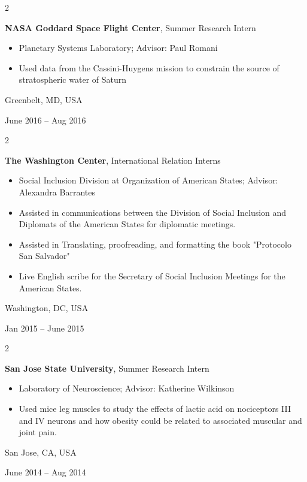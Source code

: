 \documentclass[10pt, letterpaper]{article}
\newenvironment{highlights}{
    \begin{itemize}[
        topsep=0.10 cm,
        parsep=0.10 cm,
        partopsep=0pt,
        itemsep=0pt,
        leftmargin=0.4 cm + 10pt
    ]
}{
    \end{itemize}
} %
\newenvironment{twocolentry}[2][]{
    \onecolentry
    \def\secondColumn{#2}
    \setcolumnwidth{\fill, 4.5 cm}
    \begin{paracol}{2}
}{
    \switchcolumn \raggedleft \secondColumn
    \end{paracol}
    \endonecolentry
} %
\begin{document}
        \vspace{0.2 cm}

        \begin{twocolentry}{
            Greenbelt, MD, USA

        June 2016 – Aug 2016
        }
            \textbf{NASA Goddard Space Flight Center}, Summer Research Intern
            \begin{highlights}
                \item Planetary Systems Laboratory; Advisor: Paul Romani
                \item Used data from the Cassini-Huygens mission to constrain the source of stratospheric water of Saturn
            \end{highlights}
        \end{twocolentry}


        \vspace{0.2 cm}

        \begin{twocolentry}{
            Washington, DC, USA

        Jan 2015 – June 2015
        }
            \textbf{The Washington Center}, International Relation Interns
            \begin{highlights}
                \item Social Inclusion Division at Organization of American States; Advisor: Alexandra Barrantes
                \item Assisted in communications between the Division of Social Inclusion and Diplomats of the American States for diplomatic meetings.
                \item Assisted in Translating, proofreading, and formatting the book "Protocolo San Salvador"
                \item Live English scribe for the Secretary of Social Inclusion Meetings for the American States.
            \end{highlights}
        \end{twocolentry}


        \vspace{0.2 cm}

        \begin{twocolentry}{
            San Jose, CA, USA

        June 2014 – Aug 2014
        }
            \textbf{San Jose State University}, Summer Research Intern
            \begin{highlights}
                \item Laboratory of Neuroscience; Advisor: Katherine Wilkinson
                \item Used mice leg muscles to study the effects of lactic acid on nociceptors III and IV neurons and how obesity could be related to associated muscular and joint pain.
            \end{highlights}
        \end{twocolentry}
\end{document}
